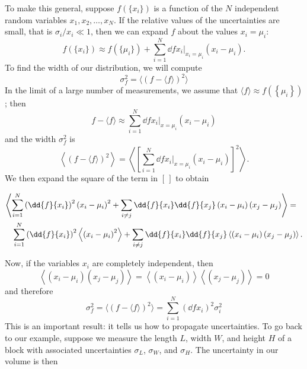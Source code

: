To make this general, suppose $f(\{x_i\})$ is a function of the $N$ independent random variables $x_1,x_2,\ldots,x_N$.
If the relative values of the uncertainties are small, that is $\sigma_i/x_i \ll 1$, then we can expand $f$ about the values $x_i = \mu_i$:
\begin{equation}
	f\left(\{x_i\}\right) \approx f\left(\{\mu_i\}\right) + \sum_{i=1}^{N} \left.\dd{f}{x_{i}}\right|_{x_{i}=\mu_{i}} 
		\left(x_{i}-\mu_{i}\right).
\end{equation}
To find the width of our distribution, we will compute
\[ \sigma_{f}^{2} = \langle\left(f-\langle f\rangle\right)^{2}\rangle \]
In the limit of a large number of measurements, we assume that $\langle f\rangle \approx f(\left\{\mu_{i}\right\})$; then
\[
	f-\langle f\rangle \approx \sum_{i=1}^{N}\left.\dd{f}{x_{i}}\right|_{x=\mu_{i}} (x_{i}-\mu_{i})
\]
and the width $\sigma_{f}^{2}$ is
\[
	\left\langle (f-\langle f\rangle)^{2}\right\rangle = \left\langle \left[\sum_{i=1}^{N} 
		\left.\dd{f}{x_{i}}\right|_{x=\mu_{i}} (x_{i}-\mu_{i})\right]^{2}\right\rangle .
\]
We then expand the square of the term in $\left[\,\right]$ to obtain
\begin{fullwidth}
\begin{eqnarray}
	\lefteqn{\left\langle\sum_{i=1}^{N}\left(\dd{f}{x_{i}}\right)^{2}
			\left(x_{i}-\mu_{i}\right)^{2}
		+ \sum_{i\neq j} \dd{f}{x_{i}}\dd{f}{x_{j}} 
			\left(x_{i}-\mu_{i}\right)\left(x_{j}-\mu_{j}\right)\right\rangle =} \nonumber\\
	&& \sum_{i=1}^{N} \left(\dd{f}{x_{i}}\right)^{2}
		\left\langle\left(x_{i}-\mu_{i}\right)^{2}\right\rangle 
	 + \sum_{i\neq j} \dd{f}{x_{i}}\dd{f}{x_{j}} 
			\left\langle\left(x_{i}-\mu_{i}\right)\left(x_{j}-\mu_{j}\right)\right\rangle .
\label{e.width-expanded}
\end{eqnarray}
\end{fullwidth}
Now, if the variables $x_{i}$ are completely independent, then
\[ \left\langle\left(x_{i}-\mu_{i}\right)\left(x_{j}-\mu_{j}\right)\right\rangle
	= 	\left\langle\left(x_{i}-\mu_{i}\right)\right\rangle
		\left\langle\left(x_{j}-\mu_{j}\right)\right\rangle = 0
\]
and therefore
\begin{equation}\label{e.propagation-uncertainities}
\sigma_{f}^{2} = \langle\left(f-\langle f\rangle\right)^{2}\rangle 
	= \sum_{i=1}^{N} \left(\dd{f}{x_{i}}\right)^{2} \sigma_{i}^{2}
\end{equation}
This is an important result: it tells us how to propagate uncertainties.  To go back to our example, suppose we measure the length $L$, width $W$, and height $H$ of a block with associated uncertainties $\sigma_L$, $\sigma_W$, and $\sigma_H$.  The uncertainty in our volume is then
